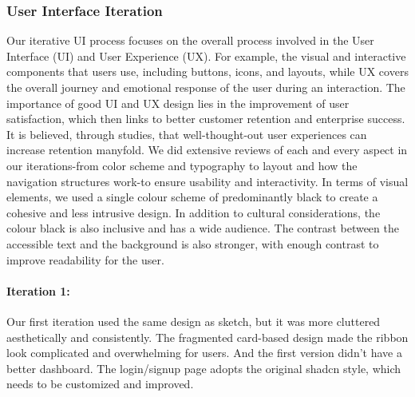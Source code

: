 \subsubsection{User Interface Iteration}
Our iterative UI process focuses on the overall process involved in the User Interface (UI) and User Experience (UX). For example, the visual and interactive components that users use, including buttons, icons, and layouts, while UX covers the overall journey and emotional response of the user during an interaction. The importance of good UI and UX design lies in the improvement of user satisfaction, which then links to better customer retention and enterprise success. It is believed, through studies, that well-thought-out user experiences can increase retention manyfold.\cite{psycray2023} We did extensive reviews of each and every aspect in our iterations-from color scheme and typography to layout and how the navigation structures work-to ensure usability and interactivity. In terms of visual elements, we used a single colour scheme of predominantly black to create a cohesive and less intrusive design. In addition to cultural considerations, the colour black is also inclusive and has a wide audience. The contrast between the accessible text and the background is also stronger, with enough contrast to improve readability for the user.

\paragraph{Iteration 1:}

Our first iteration used the same design as sketch, but it was more cluttered aesthetically and consistently. The fragmented card-based design made the ribbon look complicated and overwhelming for users. And the first version didn't have a better dashboard. The login/signup page adopts the original shadcn style, which needs to be customized and improved.

